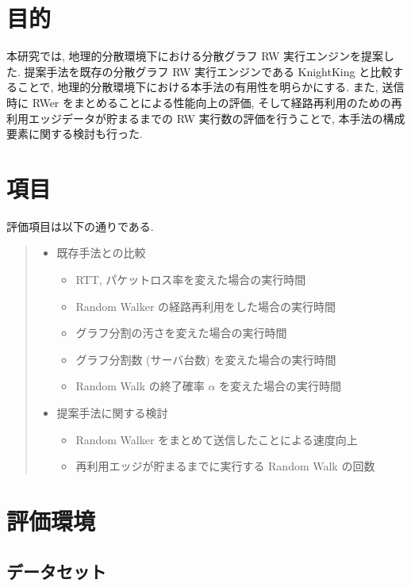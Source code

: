 \section{目的}
本研究では, 地理的分散環境下における分散グラフ RW 実行エンジンを提案した. 提案手法を既存の分散グラフ RW 実行エンジンである KnightKing \cite{10.1145/3341301.3359634} と比較することで, 地理的分散環境下における本手法の有用性を明らかにする. また, 送信時に RWer をまとめることによる性能向上の評価, そして経路再利用のための再利用エッジデータが貯まるまでの RW 実行数の評価を行うことで, 本手法の構成要素に関する検討も行った. 

\section{項目}

評価項目は以下の通りである. 
\begin{quote}
    \begin{itemize}
        \item 既存手法との比較
        \begin{itemize}
            \item RTT, パケットロス率を変えた場合の実行時間
            \item Random Walker の経路再利用をした場合の実行時間
            \item グラフ分割の汚さを変えた場合の実行時間
            \item グラフ分割数 (サーバ台数) を変えた場合の実行時間
            \item Random Walk の終了確率 $\alpha$ を変えた場合の実行時間
        \end{itemize}
        \item 提案手法に関する検討
        \begin{itemize}
            \item Random Walker をまとめて送信したことによる速度向上
            \item 再利用エッジが貯まるまでに実行する Random Walk の回数
        \end{itemize}
    \end{itemize}
\end{quote}

\section{評価環境}

\subsection{データセット}

